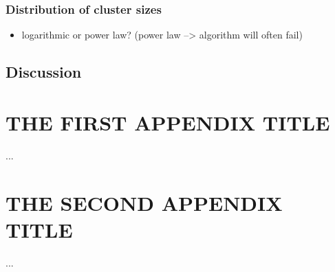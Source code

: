 \documentclass{umthesis}          %
\begin{document}
\subsection{Distribution of cluster sizes}
\label{sec-5.5.3}

\begin{itemize}

\item logarithmic or power law? (power law --> algorithm will often fail)\\
\label{sec-5.5.3.1}




\end{itemize} %
\section{Discussion}
\label{sec-5.6}


\appendix
\chapter{THE FIRST APPENDIX TITLE}
...
\chapter{THE SECOND APPENDIX TITLE}
...

\backmatter  %




\end{document}
